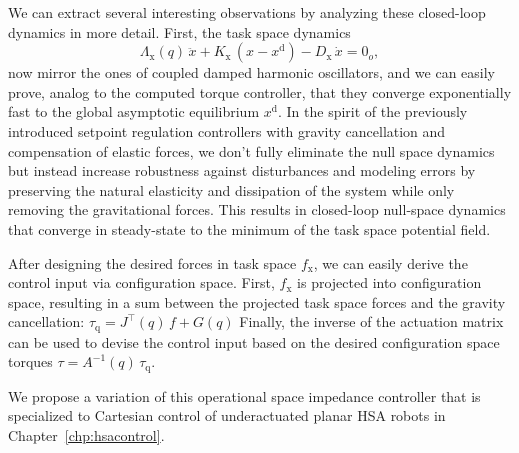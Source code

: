 We can extract several interesting observations by analyzing these closed-loop dynamics in more detail. First, the task space dynamics
\begin{equation}
    \Lambda_\mathrm{x}(q) \, \ddot{x} + K_\mathrm{x} \, (x - x^\mathrm{d}) - D_\mathrm{x} \, \dot{x} = 0_{o},
\end{equation}
now mirror the ones of coupled damped harmonic oscillators, and we can easily prove, analog to the computed torque controller, that they converge exponentially fast to the global asymptotic equilibrium $x^\mathrm{d}$.
In the spirit of the previously introduced setpoint regulation controllers with gravity cancellation and compensation of elastic forces, we don't fully eliminate the null space dynamics but instead increase robustness against disturbances and modeling errors by preserving the natural elasticity and dissipation of the system while only removing the gravitational forces. This results in closed-loop null-space dynamics that converge in steady-state to the minimum of the task space potential field.

After designing the desired forces in task space $f_\mathrm{x}$, we can easily derive the control input via configuration space. First, $f_\mathrm{x}$ is projected into configuration space, resulting in a sum between the projected task space forces and the gravity cancellation: $\tau_\mathrm{q} = J^\top(q) \, f + G(q)$ 
Finally, the inverse of the actuation matrix can be used to devise the control input based on the desired configuration space torques $\tau = A^{-1}(q) \, \tau_\mathrm{q}$.

We propose a variation of this operational space impedance controller that is specialized to Cartesian control of underactuated planar \gls{HSA} robots in Chapter~\ref{chp:hsacontrol}.